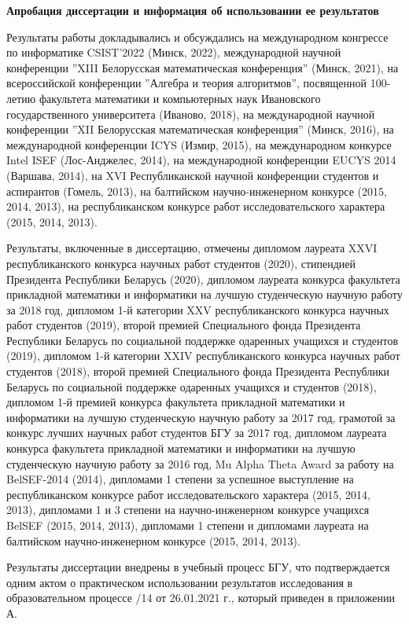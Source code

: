 \documentclass[_00_autoref.tex]{subfiles}
\begin{document}
\medskip
\centerline{\textbf{Апробация диссертации и информация об использовании ее результатов}}

Результаты работы докладывались и обсуждались на международном конгрессе по информатике CSIST'2022 (Минск, 2022), международной научной конференции ''XIII Белорусская математическая конференция'' (Минск, 2021), на всероссийской конференции ''Алгебра и теория алгоритмов'', посвященной 100-летию факультета математики и компьютерных наук Ивановского государственного университета (Иваново, 2018), на международной научной конференции ''XII Белорусская математическая конференция'' (Минск, 2016), на международной конференции ICYS (Измир, 2015), на международном конкурсе Intel ISEF (Лос-Анджелес, 2014), на международной конференции EUCYS 2014 (Варшава, 2014), на XVI Республиканской научной конференции студентов и аспирантов (Гомель, 2013), на балтийском научно-инженерном конкурсе (2015, 2014, 2013), на республиканском конкурсе работ исследовательского характера (2015, 2014, 2013).

Результаты, включенные в диссертацию, отмечены дипломом лауреата XXVI республиканского конкурса научных работ студентов (2020), стипендией Президента Республики Беларусь (2020), дипломом лауреата конкурса факультета прикладной математики и информатики на лучшую студенческую научную работу за 2018 год, дипломом 1-й категории XXV республиканского конкурса научных работ студентов (2019), второй премией Специального фонда Президента Республики Беларусь по социальной поддержке одаренных учащихся и студентов (2019), дипломом 1-й категории XXIV республиканского конкурса научных работ студентов (2018), второй премией Специального фонда Президента Республики Беларусь по социальной поддержке одаренных учащихся и студентов (2018), дипломом 1-й премией конкурса факультета прикладной математики и информатики на лучшую студенческую научную работу за 2017 год, грамотой за конкурс лучших научных работ студентов БГУ за 2017 год, дипломом лауреата конкурса факультета прикладной математики и информатики на лучшую студенческую научную работу за 2016 год, Mu Alpha Theta Award за работу на BelSEF-2014 (2014), дипломами 1 степени за успешное выступление на республиканском конкурсе работ исследовательского характера (2015, 2014, 2013), дипломами 1 и 3 степени на научно-инженерном конкурсе учащихся BelSEF (2015, 2014, 2013), дипломами 1 степени и дипломами лауреата на балтийском научно-инженерном конкурсе (2015, 2014, 2013).

Результаты диссертации внедрены в учебный процесс БГУ, что подтверждается одним актом о практическом использовании результатов исследования в образовательном процессе /14 от 26.01.2021 г., который приведен в приложении А.
\end{document}
